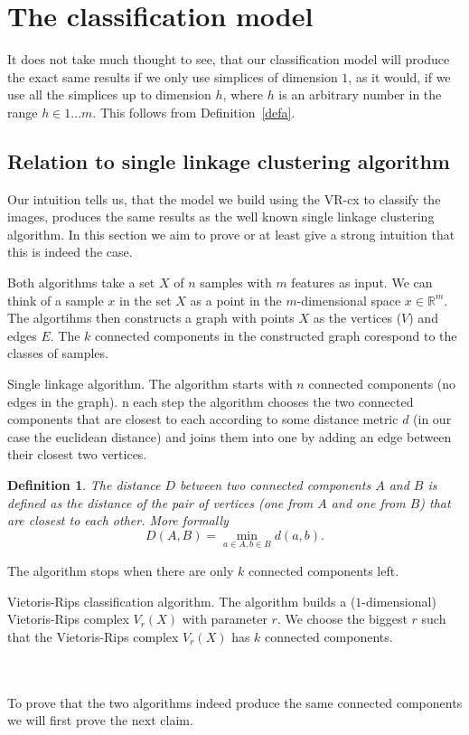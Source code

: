 \documentclass{article}
\newcommand{\enterProblemHeader}[1]{
}
\newcommand{\exitProblemHeader}[1]{
}
\newcounter{homeworkProblemCounter} %
\newcommand{\homeworkProblemName}{}
\newenvironment{homeworkProblem}[1][Problem \arabic{homeworkProblemCounter}]{ %
\stepcounter{homeworkProblemCounter} %
\renewcommand{\homeworkProblemName}{#1} %
\section{\homeworkProblemName} %
\enterProblemHeader{\homeworkProblemName} %
}{
\exitProblemHeader{\homeworkProblemName} %
}
\newcommand{\homeworkSectionName}{}
\newenvironment{homeworkSection}[1]{ %
\renewcommand{\homeworkSectionName}{#1} %
\subsection{\homeworkSectionName} %
\enterProblemHeader{\homeworkProblemName\ [\homeworkSectionName]} %
}{
\enterProblemHeader{\homeworkProblemName} %
}
\newtheorem{definition}{Definition}
\begin{document}
\begin{homeworkProblem}[The classification model]
It does not take much thought to see, that our classification model will produce the exact same results if we  only use simplices of dimension $1$, as it would, if we use all the simplices up to dimension $h$, where $h$ is an arbitrary number in the range $h \in 1...m$. This follows from Definition~\ref{defa}.

\label{sec:relationsl}
\begin{homeworkSection}{Relation to single linkage clustering algorithm}


Our intuition tells us, that the model we build using the VR-cx to classify the images, produces the same results as the well known single linkage clustering algorithm. In this section we aim to prove or at least give a strong intuition that this is indeed the case.

Both algorithms take a set $X$ of $n$ samples with $m$ features as input. We can think of a sample $x$ in the set $X$ as a point in the $m$-dimensional space $x \in \mathbb{R}^{m}$. The algortihms then constructs a graph with points $X$ as the vertices ($V$) and edges $E$. The $k$ connected components in the constructed graph corespond to the classes of samples.

\begin{paragraph}{Single linkage algorithm.}
The algorithm starts with $n$ connected components (no edges in the graph). n each step the algorithm chooses the two connected components that are closest to each according to some distance metric $d$ (in our case the euclidean distance) and joins them into one by adding an edge between their closest two vertices.

\begin{definition}
The distance $D$ between two connected components $A$ and $B$ is defined as the distance of the pair of vertices (one from $A$ and one from $B$) that are closest to each other. More formally
$$D(A, B) =  \min_{a \in A, b \in B} d(a,b).$$
\end{definition}

The algorithm stops when there are only $k$ connected components left.

\end{paragraph}

\begin{paragraph}{Vietoris-Rips classification algorithm.}
The algorithm builds a ($1$-dimensional) Vietoris-Rips complex $V_{r}(X)$ with parameter $r$. We choose the biggest $r$ such that the Vietoris-Rips complex $V_{r}(X)$ has $k$ connected components.
\end{paragraph}
\\
\\
To prove that the two algorithms indeed produce the same connected components we will first prove the next claim.


\end{homeworkSection}
\end{homeworkProblem}
\end{document}
